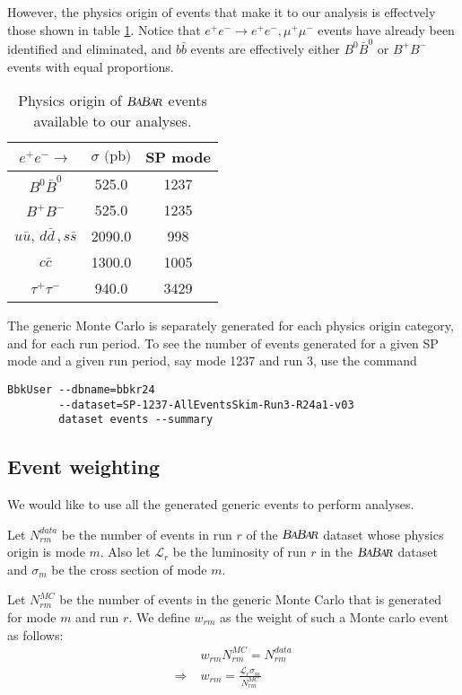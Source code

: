 \documentclass{article}
\renewcommand{\(}{\left(}
\renewcommand{\)}{\right)}
\numberwithin{equation}{section}
\begin{document}
However, the physics origin of events that make it to our analysis is effectvely those shown in table \ref{xsec}. Notice that $e^+e^-\rightarrow e^+e^-,\mu^+\mu^-$ events have already been identified and eliminated, and $b\bar{b}$ events are effectively either $B^0\bar{B}^0$ or $B^+B^-$ events with equal proportions. 
\begin{table}[H]
  \begin{center}
    \begin{tabular}{ c c c }
      $e^+e^-\rightarrow$ & $\sigma\text{ (pb)}$ & SP mode \\
      \hline\hline
      $B^0\bar{B}^0$ & 525.0 & 1237 \\
      \hline
      $B^+B^-$ & 525.0 & 1235 \\
      \hline
      $u\bar{u},\,d\bar{d}\,,s\bar{s}$ & 2090.0 & 998 \\
      \hline
      $c\bar{c}$ & 1300.0 & 1005 \\
      \hline
      $\tau^+\tau^-$ & 940.0 & 3429 \\
      \hline
    \end{tabular}
  \end{center}
  \caption{Physics origin of $\babar$ events available to our analyses.}
  \label{xsec}
\end{table}

The generic Monte Carlo is separately generated for each physics origin category, and for each run period. To see the number of events generated for a given SP mode and a given run period, say mode 1237 and run 3, use the command
\begin{verbatim}
BbkUser --dbname=bbkr24 
        --dataset=SP-1237-AllEventsSkim-Run3-R24a1-v03 
        dataset events --summary
\end{verbatim}

\subsection{Event weighting}
We would like to use all the generated generic events to perform analyses.

Let $N^{data}_{rm}$ be the number of events in run $r$ of the $\babar$ dataset whose physics origin is mode $m$. Also let $\mathcal{L}_r$ be the luminosity of run $r$ in the $\babar$ dataset and $\sigma_m$ be the cross section of mode $m$. 

Let $N^{MC}_{rm}$ be the number of events in the generic Monte Carlo that is generated for mode $m$ and run $r$. We define $w_{rm}$ as the weight of such a Monte carlo event as follows:
\begin{align}
  & w_{rm}N^{MC}_{rm}=N^{data}_{rm} \\
  \Rightarrow\;& w_{rm} = \frac{\mathcal{L}_r\sigma_m}{N^{MC}_{rm}}
\end{align}
\end{document}
